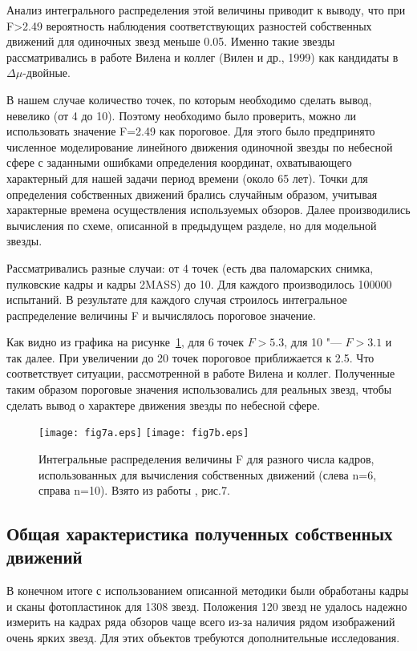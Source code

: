 Анализ интегрального распределения этой величины приводит к выводу, что при F>2.49 вероятность наблюдения соответствующих разностей собственных движений для одиночных звезд меньше 0.05. Именно такие звезды рассматривались в работе Вилена и коллег (Вилен и др., 1999) как кандидаты в $\Delta\mu$-двойные.

В нашем случае количество точек, по которым необходимо сделать вывод, невелико (от 4 до 10). Поэтому необходимо было проверить, можно ли использовать значение F=2.49 как пороговое. Для этого было предпринято численное моделирование линейного движения одиночной звезды по небесной сфере с заданными ошибками определения координат, охватывающего характерный для нашей задачи период времени (около 65 лет). Точки для определения собственных движений брались случайным образом, учитывая характерные времена осуществления используемых обзоров. Далее производились вычисления по схеме, описанной в предыдущем разделе, но для модельной звезды.

Рассматривались разные случаи: от 4 точек (есть два паломарских снимка, пулковские кадры и кадры 2MASS) до 10. Для каждого производилось 100000 испытаний. В результате для каждого случая строилось интегральное распределение величины F и вычислялось пороговое значение.

Как видно из графика на рисунке~\ref{fig:15Fint}, для 6 точек $F>5.3$, для 10 "--- $F>3.1$ и так далее. При увеличении до 20 точек пороговое приближается к 2.5. Что соответствует ситуации, рассмотренной в работе Вилена и коллег. Полученные таким образом пороговые значения использовались для реальных звезд, чтобы сделать вывод о характере движения звезды по небесной сфере.

\begin{figure}[h]
\centering
\texttt{[image: fig7a.eps]}
\texttt{[image: fig7b.eps]}
\caption{Интегральные распределения величины F для разного числа кадров, использованных для вычисления собственных движений (слева n=6, справа n=10). Взято из работы \cite{2015AstL...41..833K}, рис.7.}
\label{fig:15Fint}
\end{figure}
\subsection{Общая характеристика полученных собственных движений} \label{subsec:ch3/sect3/sub2}
В конечном итоге с использованием описанной методики были обработаны кадры и сканы фотопластинок для 1308 звезд. Положения 120 звезд не удалось надежно измерить на кадрах ряда обзоров чаще всего из-за наличия рядом изображений очень ярких звезд. Для этих объектов требуются дополнительные исследования.

